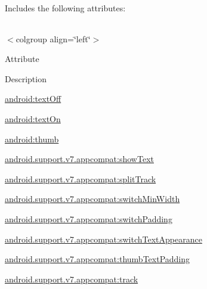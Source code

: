 Includes the following attributes\+:

\tabulinesep=1mm
\begin{longtabu} spread 0pt [c]{*{0}{|X[-1]}|}
\hline
\end{longtabu}
$<$colgroup align=\char`\"{}left\char`\"{}$>$ 

Attribute

Description 

{\ttfamily \hyperlink{classandroid_1_1support_1_1v7_1_1appcompat_1_1R_1_1styleable_ab702347a8caf8f0d2094e14753c1a529}{android\+:text\+Off}}

{\ttfamily \hyperlink{classandroid_1_1support_1_1v7_1_1appcompat_1_1R_1_1styleable_a1e5c459913d5c2e521fc63aff248c339}{android\+:text\+On}}

{\ttfamily \hyperlink{classandroid_1_1support_1_1v7_1_1appcompat_1_1R_1_1styleable_a311432ba5ee92aa27c9f9d82bdb14e82}{android\+:thumb}}

{\ttfamily \hyperlink{classandroid_1_1support_1_1v7_1_1appcompat_1_1R_1_1styleable_ae8db0533421066e36c386c0126adfebd}{android.\+support.\+v7.\+appcompat\+:show\+Text}}

{\ttfamily \hyperlink{classandroid_1_1support_1_1v7_1_1appcompat_1_1R_1_1styleable_aa41174bd1ec0a51b5ba86f4ac3002531}{android.\+support.\+v7.\+appcompat\+:split\+Track}}

{\ttfamily \hyperlink{classandroid_1_1support_1_1v7_1_1appcompat_1_1R_1_1styleable_ae597e60df7253abca490d743cc73bd17}{android.\+support.\+v7.\+appcompat\+:switch\+Min\+Width}}

{\ttfamily \hyperlink{classandroid_1_1support_1_1v7_1_1appcompat_1_1R_1_1styleable_a1e99c3ed5f4af85046d43bd8e1f6f61e}{android.\+support.\+v7.\+appcompat\+:switch\+Padding}}

{\ttfamily \hyperlink{classandroid_1_1support_1_1v7_1_1appcompat_1_1R_1_1styleable_accc91eca4539833e0ff7735849450846}{android.\+support.\+v7.\+appcompat\+:switch\+Text\+Appearance}}

{\ttfamily \hyperlink{classandroid_1_1support_1_1v7_1_1appcompat_1_1R_1_1styleable_a3401586689d04cc21ba913560a965943}{android.\+support.\+v7.\+appcompat\+:thumb\+Text\+Padding}}

{\ttfamily \hyperlink{classandroid_1_1support_1_1v7_1_1appcompat_1_1R_1_1styleable_a5b22cfa465ad7bdc9074b49b94bfc8fb}{android.\+support.\+v7.\+appcompat\+:track}}

